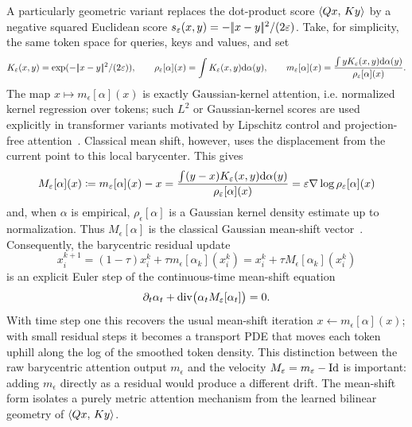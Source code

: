 A particularly geometric variant replaces the dot-product score \(\langle Qx,\,Ky\rangle\) by a negative squared Euclidean score \(s_\varepsilon(x,y)=-|\!| x-y |\!|^2/(2\varepsilon)\). Take, for simplicity, the same token space for queries, keys and values, and set
\[
	K_\varepsilon(x,y)=\exp(-|\!| x-y |\!|^2/(2\varepsilon)),
	\qquad
	\rho_\varepsilon[\alpha](x)=\int K_\varepsilon(x,y)\mathrm{d}\alpha(y),
	\qquad
	m_\varepsilon[\alpha](x)
	=
	\frac{\int yK_\varepsilon(x,y)\mathrm{d}\alpha(y)}
	     {\rho_\varepsilon[\alpha](x)}.
\]
The map $x\mapsto m_\epsilon[\alpha](x)$ is exactly Gaussian-kernel attention, i.e. normalized kernel regression over tokens; such $L^2$ or Gaussian-kernel scores are used explicitly in transformer variants motivated by Lipschitz control and projection-free attention~\cite{KimPapamakariosMnih2020L2SelfAttention,KunduGhoshGhoshHonavar2026GaussianKernelAttention}. Classical mean shift, however, uses the displacement from the current point to this local barycenter. This gives
\begin{equation}\label{eq-l2-attention-mean-shift}
	M_\varepsilon[\alpha](x)
	\coloneqq
	m_\varepsilon[\alpha](x)-x
	=
	\frac{\int (y-x)K_\varepsilon(x,y)\mathrm{d}\alpha(y)}
	     {\rho_\varepsilon[\alpha](x)}
	=
	\varepsilon\nabla\log\rho_\varepsilon[\alpha](x)
\end{equation}
and, when $\alpha$ is empirical, $\rho_\epsilon[\alpha]$ is a Gaussian kernel density estimate up to normalization. Thus \(M_\epsilon[\alpha]\) is the classical Gaussian mean-shift vector~\cite{FukunagaHostetler1975,Cheng1995MeanShift,ComaniciuMeer2002MeanShift}. Consequently, the barycentric residual update
\[
	x_i^{k+1}
	=
	(1-\tau)x_i^k+\tau m_\epsilon[\alpha_k](x_i^k)
	=
	x_i^k+\tau M_\epsilon[\alpha_k](x_i^k)
\]
is an explicit Euler step of the continuous-time mean-shift equation
\[
	\partial_t\alpha_t+\operatorname{div}\bigl(\alpha_tM_\varepsilon[\alpha_t]\bigr)=0.
\]
With time step one this recovers the usual mean-shift iteration $x\leftarrow m_\epsilon[\alpha](x)$; with small residual steps it becomes a transport PDE that moves each token uphill along the log of the smoothed token density. This distinction between the raw barycentric attention output $m_\epsilon$ and the velocity $M_\varepsilon=m_\varepsilon-\mathrm{Id}$ is important: adding $m_\epsilon$ directly as a residual would produce a different drift. The mean-shift form isolates a purely metric attention mechanism from the learned bilinear geometry of $\langle Qx,\,Ky\rangle$.

